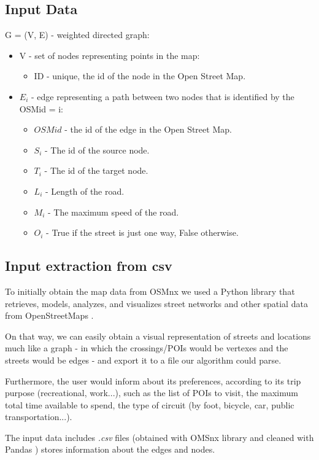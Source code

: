 \documentclass{article}
\begin{document}
\subsection*{Input Data}
G = (V, E) - weighted directed graph:
\begin{itemize}
\item V - set of nodes representing points in the map:
    \begin{itemize}
    \item ID - unique, the id of the node in the Open Street Map.
    \end{itemize}

\item $E_i$ - edge representing a path between two nodes that is identified by the OSMid = i:
    \begin{itemize}
    \item $OSM id$ - the id of the edge in the Open Street Map.
    \item $S_i$ - The id of the source node.
    \item $T_i$ - The id of the target node.
    \item $L_i$ - Length of the road.
    \item $M_i$ - The maximum speed of the road.
    \item $O_i$ - True if the street is just one way, False otherwise.
    \end{itemize}
\end{itemize}

\subsection*{Input extraction from csv}
To initially obtain the map data from OSMnx \cite{OSMnx} we used a Python library that retrieves, models, analyzes, and visualizes street networks and other spatial data from OpenStreetMaps \cite{OpenStreetMaps}. \par
On that way, we can easily obtain a visual representation of streets and locations much like a graph - in which the crossings/POIs would be vertexes and the streets would be edges - and export it to a file our algorithm could parse. \par
Furthermore, the user would inform about its preferences, according to its trip purpose (recreational, work...), such as the list of POIs to visit, the maximum total time available to spend, the type of circuit (by foot, bicycle, car, public transportation...).

The input data includes \textit{.csv} files (obtained with OMSnx library \cite{OSMnx} and cleaned with Pandas \cite{Pandas}) stores information about the edges and nodes. \newline
\end{document}
